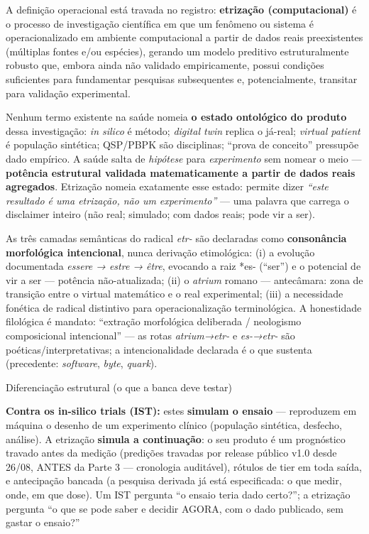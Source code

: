 \documentclass[12pt,a4paper,oneside]{report}
\begin{document}
A definição operacional está travada no registro: \textbf{etrização
(computacional)} é o processo de investigação científica em que um
fenômeno ou sistema é operacionalizado em ambiente computacional a
partir de dados reais preexistentes (múltiplas fontes e/ou espécies),
gerando um modelo preditivo estruturalmente robusto que, embora ainda
não validado empiricamente, possui condições suficientes para
fundamentar pesquisas subsequentes e, potencialmente, transitar para
validação experimental.

Nenhum termo existente na saúde nomeia \textbf{o estado ontológico do
produto} dessa investigação: \emph{in silico} é método; \emph{digital
twin} replica o já-real; \emph{virtual patient} é população sintética;
QSP/PBPK são disciplinas; ``prova de conceito'' pressupõe dado empírico.
A saúde salta de \emph{hipótese} para \emph{experimento} sem nomear o
meio --- \textbf{potência estrutural validada matematicamente a partir
de dados reais agregados}. Etrização nomeia exatamente esse estado:
permite dizer \emph{``este resultado é uma etrização, não um
experimento''} --- uma palavra que carrega o disclaimer inteiro (não
real; simulado; com dados reais; pode vir a ser).

As três camadas semânticas do radical \emph{etr-} são declaradas como
\textbf{consonância morfológica intencional}, nunca derivação
etimológica: (i) a evolução documentada \emph{essere → estre → être},
evocando a raiz *es- (``ser'') e o potencial de vir a ser --- potência
não-atualizada; (ii) o \emph{atrium} romano --- antecâmara: zona de
transição entre o virtual matemático e o real experimental; (iii) a
necessidade fonética de radical distintivo para operacionalização
terminológica. A honestidade filológica é mandato: ``extração
morfológica deliberada / neologismo composicional intencional'' --- as
rotas \emph{atrium→etr-} e \emph{es-→etr-} são poéticas/interpretativas;
a intencionalidade declarada é o que sustenta (precedente:
\emph{software}, \emph{byte}, \emph{quark}).

Diferenciação estrutural (o que a banca deve testar)

\textbf{Contra os in-silico trials (IST):} estes \textbf{simulam o
ensaio} --- reproduzem em máquina o desenho de um experimento clínico
(população sintética, desfecho, análise). A etrização \textbf{simula a
continuação}: o seu produto é um prognóstico travado antes da medição
(predições travadas por release público v1.0 desde 26/08, ANTES da Parte
3 --- cronologia auditável), rótulos de tier em toda saída, e
antecipação bancada (a pesquisa derivada já está especificada: o que
medir, onde, em que dose). Um IST pergunta ``o ensaio teria dado
certo?''; a etrização pergunta ``o que se pode saber e decidir AGORA,
com o dado publicado, sem gastar o ensaio?''
\end{document}
